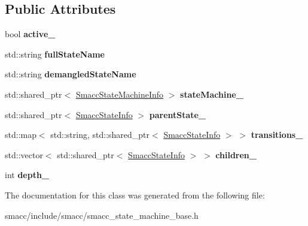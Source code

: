 \subsection*{Public Attributes}
\begin{DoxyCompactItemize}
\item 
bool {\bfseries active\+\_\+}\hypertarget{classsmacc_1_1SmaccStateInfo_a12b5db7f92c7d1bbef492b6f33d2680d}{}\label{classsmacc_1_1SmaccStateInfo_a12b5db7f92c7d1bbef492b6f33d2680d}

\item 
std\+::string {\bfseries full\+State\+Name}\hypertarget{classsmacc_1_1SmaccStateInfo_a3d9d81ebeda351fba21665bb7b9ff148}{}\label{classsmacc_1_1SmaccStateInfo_a3d9d81ebeda351fba21665bb7b9ff148}

\item 
std\+::string {\bfseries demangled\+State\+Name}\hypertarget{classsmacc_1_1SmaccStateInfo_ad36e29f3984e40d36664567f9703239a}{}\label{classsmacc_1_1SmaccStateInfo_ad36e29f3984e40d36664567f9703239a}

\item 
std\+::shared\+\_\+ptr$<$ \hyperlink{classsmacc_1_1SmaccStateMachineInfo}{Smacc\+State\+Machine\+Info} $>$ {\bfseries state\+Machine\+\_\+}\hypertarget{classsmacc_1_1SmaccStateInfo_af9884b3fda41fbc87abf9908b8bd72e7}{}\label{classsmacc_1_1SmaccStateInfo_af9884b3fda41fbc87abf9908b8bd72e7}

\item 
std\+::shared\+\_\+ptr$<$ \hyperlink{classsmacc_1_1SmaccStateInfo}{Smacc\+State\+Info} $>$ {\bfseries parent\+State\+\_\+}\hypertarget{classsmacc_1_1SmaccStateInfo_ae19f4efbeb2ca665b320df80766d9209}{}\label{classsmacc_1_1SmaccStateInfo_ae19f4efbeb2ca665b320df80766d9209}

\item 
std\+::map$<$ std\+::string, std\+::shared\+\_\+ptr$<$ \hyperlink{classsmacc_1_1SmaccStateInfo}{Smacc\+State\+Info} $>$ $>$ {\bfseries transitions\+\_\+}\hypertarget{classsmacc_1_1SmaccStateInfo_ad9a57f1532506ff82a2885e854f6132f}{}\label{classsmacc_1_1SmaccStateInfo_ad9a57f1532506ff82a2885e854f6132f}

\item 
std\+::vector$<$ std\+::shared\+\_\+ptr$<$ \hyperlink{classsmacc_1_1SmaccStateInfo}{Smacc\+State\+Info} $>$ $>$ {\bfseries children\+\_\+}\hypertarget{classsmacc_1_1SmaccStateInfo_a7773f1d9e865a839b0bfed087bbb93ba}{}\label{classsmacc_1_1SmaccStateInfo_a7773f1d9e865a839b0bfed087bbb93ba}

\item 
int {\bfseries depth\+\_\+}\hypertarget{classsmacc_1_1SmaccStateInfo_a3f44d5af069d0f37ed63b3101b330a65}{}\label{classsmacc_1_1SmaccStateInfo_a3f44d5af069d0f37ed63b3101b330a65}

\end{DoxyCompactItemize}


The documentation for this class was generated from the following file\+:\begin{DoxyCompactItemize}
\item 
smacc/include/smacc/smacc\+\_\+state\+\_\+machine\+\_\+base.\+h\end{DoxyCompactItemize}
